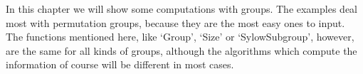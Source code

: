 


In this chapter we will show  some computations with groups. The examples
deal most with permutation groups, because they are the most easy ones to
input.  The   functions mentioned    here,   like  `Group',   `Size'   or
`SylowSubgroup', however, are the same for all  kinds of groups, although
the algorithms which compute the information  of course will be different
in most cases.


